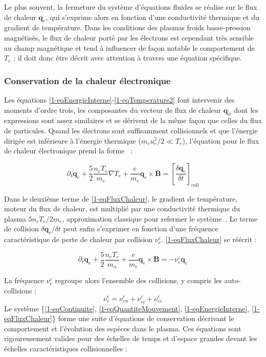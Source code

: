 \begin{refsection}
Le plus souvent, la fermeture du système d'équations fluides se réalise sur le
flux de chaleur $\mathbf q_e$, qui s'exprime alors en fonction d'une
conductivité thermique et du gradient de température. Dans les conditions des plasmas froids
basse-pression magnétisés, le flux de chaleur porté par les électrons est
cependant très sensible au champ magnétique et tend à influencer de façon
notable le comportement de $T_e$ ; il doit donc être décrit avec attention à
travers une équation spécifique.

\subsubsection{Conservation de la chaleur électronique}

Les équations \eqref{1-eqEnergieInterne}-\eqref{1-eqTemperature2} font
intervenir des moments d'ordre trois, les composantes du vecteur de flux de
chaleur $\mathbf q_\alpha$ dont les expressions sont assez similaires et se
dérivent de la même façon que celles du flux de particules. Quand les électrons
sont suffisamment collisionnels et que l'énergie dirigée est inférieure à
l'énergie thermique ($m_eu_e^2/2\ll T_e$), l'équation pour le flux de chaleur
électronique prend la forme~\parencite{Golant} :

\begin{equation}
\label{1-eqFluxChaleur}
\partial_t\mathbf
q_e+\frac{5}{2}\frac{n_e
T_e}{m_e}\nabla T_e+\frac{e}{m_e} \mathbf
q_e\times\mathbf B=\left[\frac{\delta\mathbf q_e}{\delta t}\right]_\text{coll}
\end{equation}

Dans le deuxième terme de \eqref{1-eqFluxChaleur}, le
gradient de température, moteur du flux de chaleur, est multiplié par une
conductivité thermique du plasma $5n_eT_e/2m_e$, approximation classique pour
refermer le système~\parencite{bittencourt}. Le terme de collision
$\delta\mathbf q_e/\delta t$ peut enfin s'exprimer en fonction d'une fréquence
caractéristique de perte de chaleur par collision $\nu_{e}^\varepsilon$.
\eqref{1-eqFluxChaleur} se réécrit :

\begin{equation}
\label{1-eqFluxChaleur2}
\partial_t\mathbf
q_e+\frac{5}{2}\frac{n_e
T_e}{m_\alpha}+\frac{e}{m_e} \mathbf q_e\times\mathbf
B=-\nu_{e}^\varepsilon\mathbf q_e
\end{equation}

La fréquence $\nu_e^\varepsilon$ regroupe alors l'ensemble des collisions, y
compris les auto-collisions :
\begin{equation}
\nu_e^\varepsilon=\nu_{en}^\varepsilon+\nu_{ei}^\varepsilon+\nu_{ee}^\varepsilon
\end{equation} 
Le système \{\textup{\ref{1-eqContinuite},
\ref{1-eqQuantiteMouvement}, \ref{1-eqEnergieInterne},
\ref{1-eqFluxChaleur}}\} forme une suite d'équations de conservation décrivant
le comportement et l'évolution des espèces dans le plasma.
Ces équations sont rigoureusement valides pour des échelles de temps et d'espace
grandes devant les échelles caractéristiques collisionnelles :


\end{refsection}
